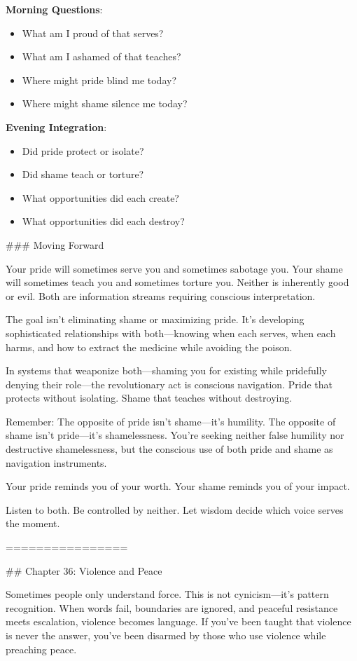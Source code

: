 \documentclass[12pt]{book}
\begin{document}
\textbf{Morning Questions}:
\begin{itemize}
\item What am I proud of that serves?
\item What am I ashamed of that teaches?
\item Where might pride blind me today?
\item Where might shame silence me today?

\end{itemize}
\textbf{Evening Integration}:
\begin{itemize}
\item Did pride protect or isolate?
\item Did shame teach or torture?
\item What opportunities did each create?
\item What opportunities did each destroy?

\end{itemize}
\#\#\# Moving Forward

Your pride will sometimes serve you and sometimes sabotage you. Your shame will sometimes teach you and sometimes torture you. Neither is inherently good or evil. Both are information streams requiring conscious interpretation.

The goal isn't eliminating shame or maximizing pride. It's developing sophisticated relationships with both—knowing when each serves, when each harms, and how to extract the medicine while avoiding the poison.

In systems that weaponize both—shaming you for existing while pridefully denying their role—the revolutionary act is conscious navigation. Pride that protects without isolating. Shame that teaches without destroying.

Remember: The opposite of pride isn't shame—it's humility. The opposite of shame isn't pride—it's shamelessness. You're seeking neither false humility nor destructive shamelessness, but the conscious use of both pride and shame as navigation instruments.

Your pride reminds you of your worth. Your shame reminds you of your impact.

Listen to both. Be controlled by neither. Let wisdom decide which voice serves the moment.

================

\#\# Chapter 36: Violence and Peace

Sometimes people only understand force. This is not cynicism—it's pattern recognition. When words fail, boundaries are ignored, and peaceful resistance meets escalation, violence becomes language. If you've been taught that violence is never the answer, you've been disarmed by those who use violence while preaching peace.
\end{document}
